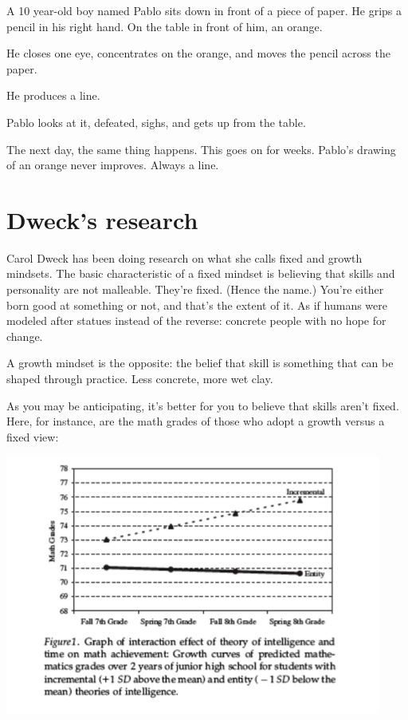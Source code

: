 A 10 year-old boy named Pablo sits down in front of a piece of paper. He grips a
pencil in his right hand. On the table in front of him, an orange.

He closes one eye, concentrates on the orange, and moves the pencil across the
paper.

He produces a line.

Pablo looks at it, defeated, sighs, and gets up from the table.

The next day, the same thing happens. This goes on for weeks. Pablo's drawing of
an orange never improves. Always a line.

\section{Dweck's research}

Carol Dweck has been doing research on what she calls fixed and growth
mindsets. The basic characteristic of a fixed mindset is believing that skills
and personality are not malleable. They're fixed. (Hence the name.) You're either born good at
something or not, and that's the extent of it. As if humans were modeled after statues instead of the reverse: concrete people
with no hope for change.

A growth mindset is the opposite: the belief that skill is something that can be
shaped through practice. Less concrete, more wet clay.

As you may be anticipating, it's better for you to believe that skills aren't
fixed. Here, for instance, are the math grades of those who adopt a growth
versus a fixed view:

\includegraphics[width=\textwidth]{graphics/fixed-vs-growth-math-dweck}

